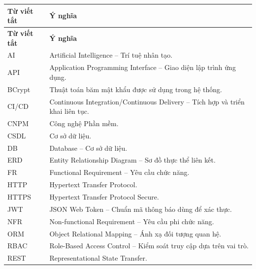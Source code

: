 \documentclass[14pt,a4paper,oneside]{extreport}
\begin{document}
\begin{longtable}{
    L{3cm}
    L{10.5cm}
}

\toprule
\textbf{Từ viết tắt}
&
\textbf{Ý nghĩa}
\\
\midrule
\endfirsthead

\toprule
\textbf{Từ viết tắt}
&
\textbf{Ý nghĩa}
\\
\midrule
\endhead

AI
&
Artificial Intelligence -- Trí tuệ nhân tạo.
\\

API
&
Application Programming Interface -- Giao diện lập trình ứng dụng.
\\

BCrypt
&
Thuật toán băm mật khẩu được sử dụng trong hệ thống.
\\

CI/CD
&
Continuous Integration/Continuous Delivery -- Tích hợp và triển khai liên tục.
\\

CNPM
&
Công nghệ Phần mềm.
\\

CSDL
&
Cơ sở dữ liệu.
\\

DB
&
Database -- Cơ sở dữ liệu.
\\

ERD
&
Entity Relationship Diagram -- Sơ đồ thực thể liên kết.
\\

FR
&
Functional Requirement -- Yêu cầu chức năng.
\\

HTTP
&
Hypertext Transfer Protocol.
\\

HTTPS
&
Hypertext Transfer Protocol Secure.
\\

JWT
&
JSON Web Token -- Chuẩn mã thông báo dùng để xác thực.
\\

NFR
&
Non-functional Requirement -- Yêu cầu phi chức năng.
\\

ORM
&
Object Relational Mapping -- Ánh xạ đối tượng quan hệ.
\\

RBAC
&
Role-Based Access Control -- Kiểm soát truy cập dựa trên vai trò.
\\

REST
&
Representational State Transfer.
\\


\end{longtable}
\end{document}
